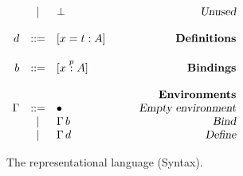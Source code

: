 \begin{figure}
\begin{center}
\begin{math}
\begin{array}{rclr}
&|&
\bot
& \qquad\textsl{Unused}
\\
\\
d 
&::=& 
[x = t : A] 
& \qquad\textsl{\bf Definitions}
\\
\\
b
&::=& [x \stackrel{p}{:} A]
& \qquad\textsl{\bf Bindings}
\\
\\
&&&\qquad\textsl{\bf Environments}\\
\Gamma 

&::=&
\bullet
& \qquad\textsl{Empty environment}
\\

&|&
\Gamma \, b
& \qquad\textsl{Bind}
\\
&|&
\Gamma \, d
& \qquad\textsl{Define}
\\

\end{array}
\end{math}
\end{center}

\caption{The {\system} representational language (Syntax).}
\label{fig:syntax-s2}
\end{figure}
